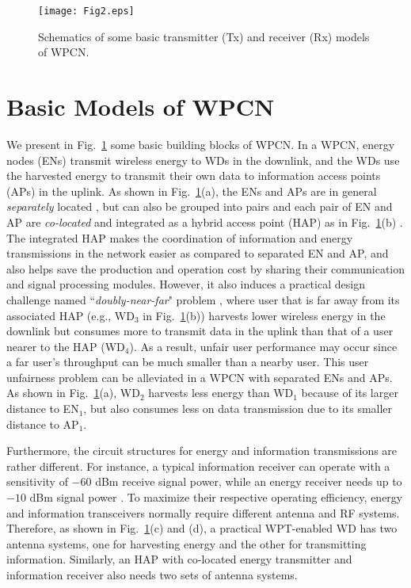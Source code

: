 \documentclass[journal, draftcls, one column, 12pt]{IEEEtran}
\begin{document}
\begin{figure}
\centering
  \begin{center}
    \texttt{[image: Fig2.eps]}
  \end{center}
  \caption{Schematics of some basic transmitter (Tx) and receiver (Rx) models of WPCN.}
  \label{72}
\end{figure}

\section{Basic Models of WPCN}
We present in Fig.~\ref{72} some basic building blocks of WPCN. In a WPCN, energy nodes (ENs) transmit wireless energy to WDs in the downlink, and the WDs use the harvested energy to transmit their own data to information access points (APs) in the uplink. As shown in Fig.~\ref{72}(a), the ENs and APs are in general \emph{separately} located \cite{2014:Huang}, but can also be grouped into pairs and each pair of EN and AP are \emph{co-located} and integrated as a hybrid access point (HAP) as in Fig.~\ref{72}(b) \cite{2014:Ju}. The integrated HAP makes the coordination of information and energy transmissions in the network easier as compared to separated EN and AP, and also helps save the production and operation cost by sharing their communication and signal processing modules. However, it also induces a practical design challenge named ``\emph{doubly-near-far}" problem \cite{2014:Ju}, where user that is far away from its associated HAP (e.g., WD$_3$ in Fig.~\ref{72}(b)) harvests lower wireless energy in the downlink but consumes more to transmit data in the uplink than that of a user nearer to the HAP (WD$_4$). As a result, unfair user performance may occur since a far user's throughput can be much smaller than a nearby user. This user unfairness problem can be alleviated in a WPCN with separated ENs and APs. As shown in Fig.~\ref{72}(a), WD$_2$ harvests less energy than WD$_1$ because of its larger distance to EN$_1$, but also consumes less on data transmission due to its smaller distance to AP$_1$.

Furthermore, the circuit structures for energy and information transmissions are rather different. For instance, a typical information receiver can operate with a sensitivity of $-60$ dBm receive signal power, while an energy receiver needs up to $-10$ dBm signal power \cite{2015:Bi}. To maximize their respective operating efficiency, energy and information transceivers normally require different antenna and RF systems. Therefore, as shown in Fig.~\ref{72}(c) and (d), a practical WPT-enabled WD has two antenna systems, one for harvesting energy and the other for transmitting information. Similarly, an HAP with co-located energy transmitter and information receiver also needs two sets of antenna systems.
\end{document}
